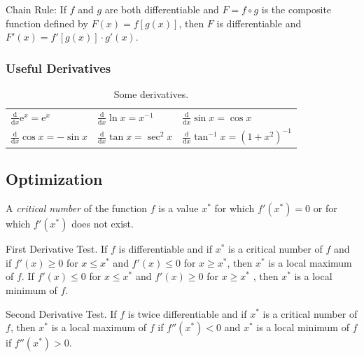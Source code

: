 \documentclass[captions=tableheading]{scrbook}
\begin{document}
\begin{example}
\begin{thm}
Chain Rule: If \(f\) and \(g\) are both differentiable and \(F=f\circ g\) is the composite function defined by \(F(x)=f[g(x)]\), then \(F\) is differentiable and \(F'(x) = f'[ g(x) ] \cdot g'(x)\).  
\end{thm}
\subsubsection{Useful Derivatives}
\label{sec-21-2-2-2}



\begin{table}[htb]
\caption[Some derivatives]{Some derivatives.} \label{tab-Useful-Derivatives}
\begin{center}
\begin{tabular}{lll}
 \(\frac{\mathrm{d}}{\mathrm{d} x}\mathrm{e}^{x}=\mathrm{e}^{x}\)  &  \(\frac{\mathrm{d}}{\mathrm{d} x}\ln x=x^{-1}\)      &  \(\frac{\mathrm{d}}{\mathrm{d} x}\sin x=\cos x\)              \\
 \(\frac{\mathrm{d}}{\mathrm{d} x}\cos x=-\sin x\)                 &  \(\frac{\mathrm{d}}{\mathrm{d} x}\tan x=\sec^{2}x\)  &  \(\frac{\mathrm{d}}{\mathrm{d} x}\tan^{-1}x=(1+x^{2})^{-1}\)  \\
\end{tabular}
\end{center}
\end{table}
\subsection{Optimization}
\label{sec-21-2-3}

\begin{defn}
A \emph{critical number} of the function \(f\) is a value \(x^{\ast}\) for which \(f'(x^{\ast})=0\) or for which \(f'(x^{\ast})\) does not exist.
\end{defn}

\begin{thm}
First Derivative Test. If \(f\) is differentiable and if \(x^{\ast}\) is a critical number of \(f\) and if \(f'(x)\geq0\) for \(x\leq x^{\ast}\) and \(f'(x)\leq0\) for \(x\geq x^{\ast}\), then \(x^{\ast}\) is a local maximum of \(f\). If \(f'(x)\leq0\) for \(x\leq x^{\ast}\) and \(f'(x)\geq0\) for \(x\geq x^{\ast}\) , then \(x^{\ast}\) is a local minimum of \(f\).
\end{thm}

\begin{thm}
Second Derivative Test. If \(f\) is twice differentiable and if \(x^{\ast}\) is a critical number of \(f\), then \(x^{\ast}\) is a local maximum of \(f\) if \(f''(x^{\ast})<0\) and \(x^{\ast}\) is a local minimum of \(f\) if \(f''(x^{\ast})>0\).
\end{thm}

\end{example}
\end{document}

